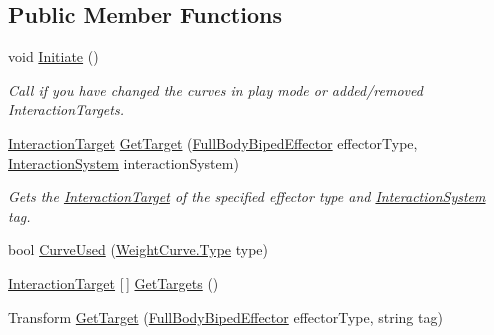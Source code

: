 \subsection*{Public Member Functions}
\begin{DoxyCompactItemize}
\item 
void \mbox{\hyperlink{class_root_motion_1_1_final_i_k_1_1_interaction_object_ae8d77c984a0f9257d83636d05067ad14}{Initiate}} ()
\begin{DoxyCompactList}\small\item\em Call if you have changed the curves in play mode or added/removed Interaction\+Targets. \end{DoxyCompactList}\item 
\mbox{\hyperlink{class_root_motion_1_1_final_i_k_1_1_interaction_target}{Interaction\+Target}} \mbox{\hyperlink{class_root_motion_1_1_final_i_k_1_1_interaction_object_a946e3d9232fa533ef0c246eecb8ccbb5}{Get\+Target}} (\mbox{\hyperlink{namespace_root_motion_1_1_final_i_k_ae0dd2058c7667b6f132c11a6b860c14a}{Full\+Body\+Biped\+Effector}} effector\+Type, \mbox{\hyperlink{class_root_motion_1_1_final_i_k_1_1_interaction_system}{Interaction\+System}} interaction\+System)
\begin{DoxyCompactList}\small\item\em Gets the \mbox{\hyperlink{class_root_motion_1_1_final_i_k_1_1_interaction_target}{Interaction\+Target}} of the specified effector type and \mbox{\hyperlink{class_root_motion_1_1_final_i_k_1_1_interaction_system}{Interaction\+System}} tag. \end{DoxyCompactList}\item 
bool \mbox{\hyperlink{class_root_motion_1_1_final_i_k_1_1_interaction_object_a04c4786c46909ea5cd1b6954f69c49a2}{Curve\+Used}} (\mbox{\hyperlink{class_root_motion_1_1_final_i_k_1_1_interaction_object_1_1_weight_curve_a74c8be2e80ace86b130c88e275300b27}{Weight\+Curve.\+Type}} type)
\item 
\mbox{\hyperlink{class_root_motion_1_1_final_i_k_1_1_interaction_target}{Interaction\+Target}} \mbox{[}$\,$\mbox{]} \mbox{\hyperlink{class_root_motion_1_1_final_i_k_1_1_interaction_object_ae4eab207230e4d8cb7d818e11804ba15}{Get\+Targets}} ()
\item 
Transform \mbox{\hyperlink{class_root_motion_1_1_final_i_k_1_1_interaction_object_a24037892e4871633a3ad3ba72e7a0d0f}{Get\+Target}} (\mbox{\hyperlink{namespace_root_motion_1_1_final_i_k_ae0dd2058c7667b6f132c11a6b860c14a}{Full\+Body\+Biped\+Effector}} effector\+Type, string tag)
\item 

\end{DoxyCompactItemize}
